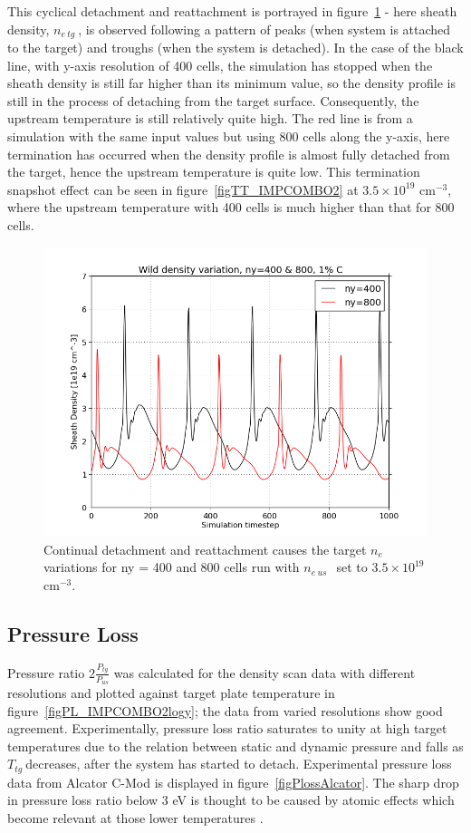 \documentclass[12pt]{article}  %
\providecommand{\noNe}[1]{{${#1}\times 10^{19}$ cm$^{-3}$}} %
\providecommand{\neus}{$n_{e~us}~$} %
\providecommand{\netg}{$n_{e~tg}~$} %
\providecommand{\Ttg}{$T_{tg}~$} %
\begin{document}
This cyclical detachment and reattachment is portrayed in figure~\ref{figny400800r35netg} - here sheath density, \netg, is observed following a pattern of peaks (when system is attached to the target) and troughs (when the system is detached). In the case of the black line, with y-axis resolution of 400 cells, the simulation has stopped when the sheath density is still far higher than its minimum value, so the density profile is still in the process of detaching from the target surface. Consequently, the upstream temperature is still relatively quite high. The red line is from a simulation with the same input values but using 800 cells along the y-axis, here termination has occurred when the density profile is almost fully detached from the target, hence the upstream temperature is quite low. This termination snapshot effect can be seen in figure~\ref{figTT_IMPCOMBO2} at \noNe{3.5}, where the upstream temperature with 400 cells is much higher than that for 800 cells.

\begin{figure}
\includegraphics[scale=0.5]{Figures/sol1d/ny400800r35netg.png}
\centering
\caption{Continual detachment and reattachment causes the target $n_e$ variations for ny = 400 and 800 cells run with \neus~set to \noNe{3.5}.}\label{figny400800r35netg}
\end{figure}



\subsection{Pressure Loss}\label{ssecPloss}
Pressure ratio $2\frac{P_{tg}}{P_{us}}$ was calculated for the density scan data with different resolutions and plotted against target plate temperature in figure~\ref{figPL_IMPCOMBO2logy}; the data from varied resolutions show good agreement. Experimentally, pressure loss ratio saturates to unity at high target temperatures due to the relation between static and dynamic pressure and falls as \Ttg decreases, after the system has started to detach. Experimental pressure loss data from Alcator C-Mod is displayed in figure~\ref{figPlossAlcator}. The sharp drop in pressure loss ratio below 3 eV is thought to be caused by atomic effects which become relevant at those lower temperatures \cite{Pitcher1997}.
\end{document}
